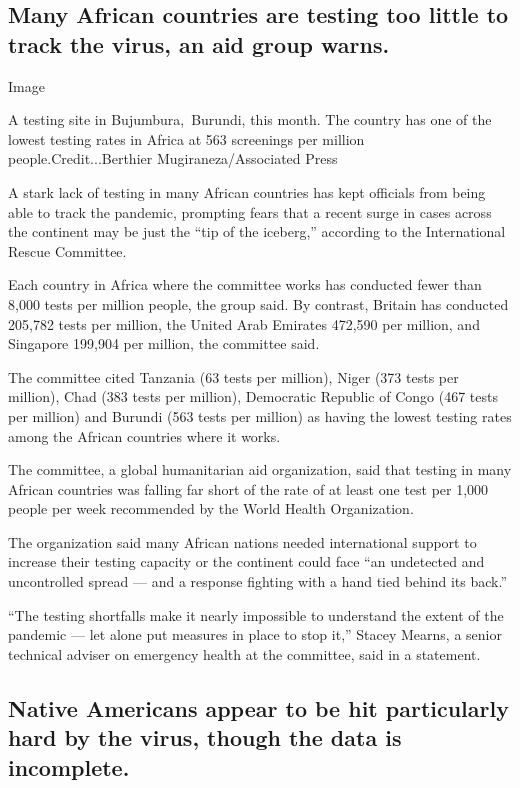 \hypertarget{many-african-countries-are-testing-too-little-to-track-the-virus-an-aid-group-warns}{%
\subsection{Many African countries are testing too little to track the
virus, an aid group
warns.}\label{many-african-countries-are-testing-too-little-to-track-the-virus-an-aid-group-warns}}

Image

A testing site in Bujumbura,~Burundi, this month. The country has one of
the lowest testing rates in Africa at 563 screenings per million
people.Credit...Berthier Mugiraneza/Associated Press

A stark lack of testing in many African countries has kept officials
from being able to track the pandemic, prompting fears that a recent
surge in cases across the continent may be just the ``tip of the
iceberg,'' according to the International Rescue Committee.

Each country in Africa where the committee works has conducted fewer
than 8,000 tests per million people, the group said. By contrast,
Britain has conducted 205,782 tests per million, the United Arab
Emirates 472,590 per million, and Singapore 199,904 per million, the
committee said.

The committee cited Tanzania (63 tests per million), Niger (373 tests
per million), Chad (383 tests per million), Democratic Republic of Congo
(467 tests per million) and Burundi (563 tests per million) as having
the lowest testing rates among the African countries where it works.

The committee, a global humanitarian aid organization, said that testing
in many African countries was falling far short of the rate of at least
one test per 1,000 people per week recommended by the World Health
Organization.

The organization said many African nations needed international support
to increase their testing capacity or the continent could face ``an
undetected and uncontrolled spread --- and a response fighting with a
hand tied behind its back.''

``The testing shortfalls make it nearly impossible to understand the
extent of the pandemic --- let alone put measures in place to stop it,''
Stacey Mearns, a senior technical adviser on emergency health at the
committee, said in a statement.

\hypertarget{native-americans-appear-to-be-hit-particularly-hard-by-the-virus-though-the-data-is-incomplete}{%
\subsection{Native Americans appear to be hit particularly hard by the
virus, though the data is
incomplete.}\label{native-americans-appear-to-be-hit-particularly-hard-by-the-virus-though-the-data-is-incomplete}}

